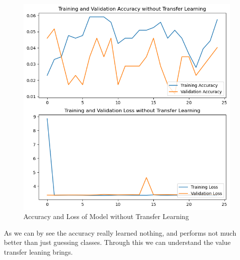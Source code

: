 \documentclass[12pt]{article}
\begin{document}
\begin{figure}[H]
    \centering
    \includegraphics*[scale=0.5]{images/loss+acc no tf.png}\\
    Accuracy and Loss of Model without Transfer Learning
\end{figure}
As we can by see the accuracy really learned nothing, and performs not much better than just guessing classes. Through this we can understand the value transfer leaning brings.
\\
\end{document}
